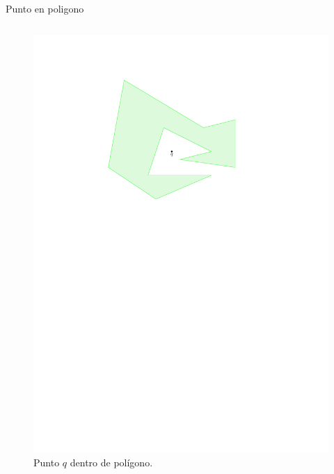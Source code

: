 \documentclass[aspectratio=169,xcolor=dvipsnames, t]{beamer}
\begin{document}
\begin{frame}[c]{Punto en poligono}
\begin{columns}
\begin{column}{0.45\textwidth}
      \begin{figure}
        \centering
        \includegraphics[width=\linewidth, height=0.5\textheight, page=2, keepaspectratio]{IPE/pip.pdf}
        \caption{Punto $q$ dentro de polígono.}
      \end{figure}
    \end{column}
  \end{columns}
\end{frame}
\end{document}
